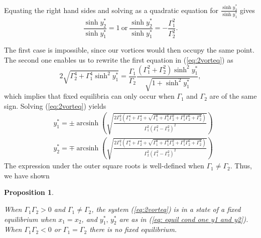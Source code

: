 \documentclass[11pt,twoside]{article}
\DeclareMathOperator{\arcsinh}{arcsinh}
\newtheorem{prop}[theorem]{Proposition}
\theoremstyle{definition}
\numberwithin{equation}{section}
\begin{document}
Equating the right hand sides and solving as a quadratic equation for $\frac{\sinh y_2^{\ast}}{\sinh y_1^{\ast}}$ gives
\begin{equation*}
\frac{\sinh y_2^{\ast}}{\sinh y_1^{\ast}} = 1 \ \mathrm{or}    \ \frac{\sinh y_2^{\ast}}{\sinh y_1^{\ast}} = -\frac{\Gamma_1^2}{\Gamma_2^2}.
\end{equation*}

The first case is impossible, since our vortices would then occupy the same point. The second one enables us to rewrite the first equation in (\ref{eq:2vorteq}) as
\begin{equation}
    2\sqrt{\Gamma_2^4+ \Gamma_1^4\sinh^2y^{\ast}_1} = \frac{\Gamma_1}{\Gamma_2} \frac{\left(\Gamma_1^2+\Gamma_2^2\right)\sinh^2y^{\ast}_1}{\sqrt{1 + \sinh^2 y^{\ast}_1}},
\end{equation}
which implies that fixed equilibria can only occur when $\Gamma_1$ and $\Gamma_2$ are of the same sign. Solving (\ref{eq:2vorteq}) yields
\begin{equation}
\label{eq: equil cond one y1 and y2}
\begin{split}
   &y^{\ast}_1 = \pm\arcsinh\left( \sqrt{\frac{2\Gamma_2^2 \left(\Gamma_1^4+\Gamma_2^4 +\sqrt{ \Gamma_1^8+\Gamma_1^6 \Gamma_2^2+\Gamma_1^2 \Gamma_2^6+\Gamma_2^8}\right)}{\Gamma_1^2\left(\Gamma_1^2- \Gamma_2^2\right)^2}}\right)\\
   &y^{\ast}_2 =  \mp\arcsinh\left( \sqrt{\frac{2\Gamma_1^2 \left(\Gamma_1^4+\Gamma_2^4 +\sqrt{ \Gamma_1^8+\Gamma_1^6 \Gamma_2^2+\Gamma_1^2 \Gamma_2^6+\Gamma_2^8}\right)}{\Gamma_2^2\left(\Gamma_1^2- \Gamma_2^2\right)^2}}\right)
   \end{split}
\end{equation}
The expression under the outer square roots is well-defined when $\Gamma_1\ne \Gamma_2$. Thus, we have shown


\begin{prop}
\label{lem: fixed equilib 2 vort}

When $\Gamma_1\Gamma_2>0$ and $\Gamma_1\ne\Gamma_2$, the system (\ref{eq:2vorteq}) is in a state of a fixed equilibrium when  $x_1 = x_2$, and $y^{\ast}_1,\, y^{\ast}_2$ are as in (\ref{eq: equil cond one y1 and y2}). When $\Gamma_1\Gamma_2<0$ or $\Gamma_1=\Gamma_2$ there is no fixed equilibrium. 
 \end{prop}
\end{document}
